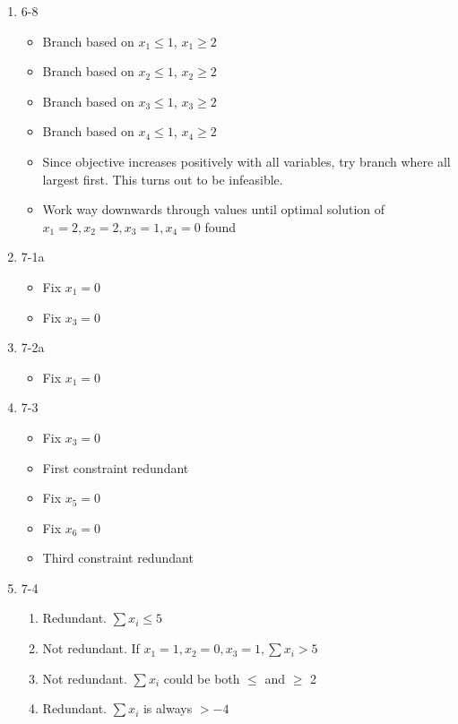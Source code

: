 \documentclass[12pt, letter]{article}
\begin{document}
\begin{enumerate}
	\item 6-8
	\begin{itemize}
		\item Branch based on $x_1 \le 1$, $x_1 \ge 2$
		\item Branch based on $x_2 \le 1$, $x_2 \ge 2$
		\item Branch based on $x_3 \le 1$, $x_3 \ge 2$
		\item Branch based on $x_4 \le 1$, $x_4 \ge 2$
		\item Since objective increases positively with all variables, try branch where all largest first. This turns out to be infeasible.
		\item Work way downwards through values until optimal solution of $x_1=2, x_2=2, x_3=1, x_4=0$ found
	\end{itemize}
	\item 7-1a
	\begin{itemize}
		\item Fix $x_1=0$
		\item Fix $x_3=0$ 
	\end{itemize}
	\item 7-2a
	\begin{itemize}
		\item Fix $x_1=0$
	\end{itemize}
	\item 7-3
	\begin{itemize}
		\item Fix $x_3=0$ 
		\item First constraint redundant
		\item Fix $x_5=0$ 
		\item Fix $x_6=0$ 
		\item Third constraint redundant
	\end{itemize}
	\item 7-4
	\begin{enumerate}
		\item Redundant. $\sum x_i \le 5$
		\item Not redundant. If $x_1=1,x_2=0,x_3=1, \sum x_i > 5$
		\item Not redundant. $\sum x_i$ could be both $\le$ and $\ge$ 2
		\item Redundant. $\sum x_i$ is always $>-4$
	\end{enumerate}
\end{enumerate}
\end{document}
